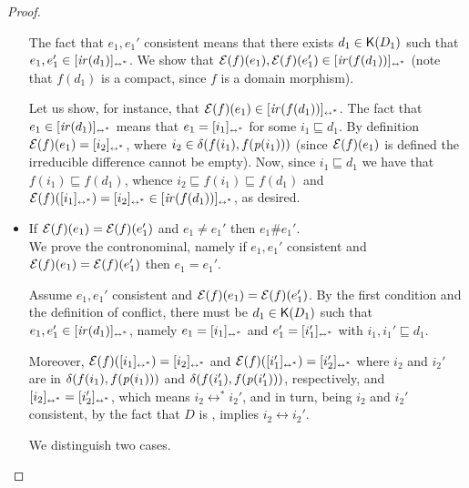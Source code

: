\begin{proof}
\begin{itemize}
    The fact that $e_1, e_1'$ consistent means that there exists
    $d_1 \in \mathop{\mathsf{K}({D_1})}$ such that
    $e_1, e_1' \in [{\mathop{\mathit{ir}({d_1})}}]_{\scriptscriptstyle {\leftrightarrow^*}}$. We show that
    $\mathcal{E}({f})(e_1), \mathcal{E}({f})(e_1') \in [{\mathop{\mathit{ir}({f(d_1)})}}]_{\scriptscriptstyle {\leftrightarrow^*}}$ (note
    that $f(d_1)$ is a compact, since $f$ is a domain morphism). 

    Let us show, for instance, that
    $\mathcal{E}({f})(e_1) \in [{\mathop{\mathit{ir}({f(d_1)})}}]_{\scriptscriptstyle {\leftrightarrow^*}}$. The fact that
    $e_1 \in [{\mathop{\mathit{ir}({d_1})}}]_{\scriptscriptstyle {\leftrightarrow^*}}$ means that $e_1 = [{i_1}]_{\scriptscriptstyle {\leftrightarrow^*}}$
    for some $i_1 \sqsubseteq d_1$. By definition
    $\mathcal{E}({f})(e_1) = [{i_2}]_{\scriptscriptstyle {\leftrightarrow^*}}$, where
    $i_2 \in \delta({f(i_1)},{f(\mathit{p}({i_1}))})$ (since $\mathcal{E}({f})(e_1)$ is
    defined the irreducible difference cannot be empty). Now, since
    $i_1 \sqsubseteq d_1$ we have that $f(i_1) \sqsubseteq f(d_1)$,
    whence $i_2 \sqsubseteq f(i_1) \sqsubseteq f(d_1)$ and
    $\mathcal{E}({f})([{i_1}]_{\scriptscriptstyle {\leftrightarrow^*}}) = [{i_2}]_{\scriptscriptstyle {\leftrightarrow^*}} \in
    [{\mathop{\mathit{ir}({f(d_1)})}}]_{\scriptscriptstyle {\leftrightarrow^*}}$, as desired.

  \item If $\mathcal{E}({f})(e_1) = \mathcal{E}({f})(e_1')$ and $e_1 \neq e_1'$ 
    then $e_1 \# e_1'$.\\
    We prove the contronominal, namely if $e_1, e_1'$ consistent and
    $\mathcal{E}({f})(e_1) = \mathcal{E}({f})(e_1')$ then $e_1=e_1'$.

    Assume $e_1, e_1'$ consistent and $\mathcal{E}({f})(e_1) = \mathcal{E}({f})(e_1')$. By
    the first condition and the definition of conflict, there must be $d_1 \in \mathop{\mathsf{K}({D_1})}$ such
    that $e_1, e_1' \in [{\mathop{\mathit{ir}({d_1})}}]_{\scriptscriptstyle {\leftrightarrow^*}}$, namely
    $e_1=[{i_1}]_{\scriptscriptstyle {\leftrightarrow^*}}$ and ${e_1'}=[{i_1'}]_{\scriptscriptstyle {\leftrightarrow^*}}$ with
    $i_1, i_1' \sqsubseteq d_1$.

    Moreover, $\mathcal{E}({f})([{i_1}]_{\scriptscriptstyle {\leftrightarrow^*}}) = [{i_2}]_{\scriptscriptstyle {\leftrightarrow^*}}$ and
    $\mathcal{E}({f})([{i_1'}]_{\scriptscriptstyle {\leftrightarrow^*}}) = [{i_2'}]_{\scriptscriptstyle {\leftrightarrow^*}}$ where $i_2$ and
    $i_2'$ are in $\delta({f(i_1)},{f(\mathit{p}({i_1}))})$ and
    $\delta({f(i_1')},{f(\mathit{p}({i_1'}))})$, respectively, and
    $[{i_2}]_{\scriptscriptstyle {\leftrightarrow^*}} = [{i_2'}]_{\scriptscriptstyle {\leftrightarrow^*}}$, which means
    $i_2 \leftrightarrow^* i_2'$, and in turn, being $i_2$ and $i_2'$
    consistent, by the fact that $D$ is {\wi},
    implies
    $i_2 \leftrightarrow i_2'$. 

    We distinguish two cases.


\end{itemize}
\end{proof}
